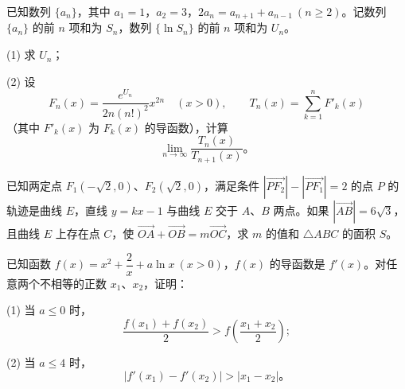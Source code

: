 \begin{question}
已知数列 $\{a_n\}$，其中 $a_1=1$，$a_2=3$，$2a_n=a_{n+1}+a_{n-1}\ (n\geqslant2)$。记数列 $\{a_n\}$ 的前 $n$ 项和为 $S_n$，数列 $\{\ln S_n\}$ 的前 $n$ 项和为 $U_n$。

(1) 求 $U_n$；

(2) 设
\nopagebreak[4]
\[
F_n(x)=\frac{e^{U_n}}{2n(n!)^2}x^{2n}\quad(x>0),\qquad
T_n(x)=\sum_{k=1}^{n}F'_k(x)
\]
（其中 $F'_k(x)$ 为 $F_k(x)$ 的导函数），计算
\nopagebreak[4]
\[
\lim_{n\to\infty}\frac{T_n(x)}{T_{n+1}(x)}\mbox{。}
\]

\end{question}
\begin{question}
已知两定点 $F_1(-\sqrt2,0)\text{、}F_2(\sqrt2,0)$，满足条件 $|\overrightarrow{PF_2}|-|\overrightarrow{PF_1}|=2$ 的点 $P$ 的轨迹是曲线 $E$，直线 $y=kx-1$ 与曲线 $E$ 交于 $A\text{、}B$ 两点。如果 $|\overrightarrow{AB}|=6\sqrt3$，且曲线 $E$ 上存在点 $C$，使 $\overrightarrow{OA}+\overrightarrow{OB}=m\overrightarrow{OC}$，求 $m$ 的值和 $\triangle ABC$ 的面积 $S$。

\end{question}
\begin{question}
已知函数 $f(x)=x^2+\dfrac2x+a\ln x\ (x>0)$，$f(x)$ 的导函数是 $f'(x)$。对任意两个不相等的正数 $x_1\text{、}x_2$，证明：

(1) 当 $a\leqslant0$ 时，
\nopagebreak[4]
\[
\frac{f(x_1)+f(x_2)}2>f\left(\frac{x_1+x_2}2\right);
\]

(2) 当 $a\leqslant4$ 时，
\nopagebreak[4]
\[
|f'(x_1)-f'(x_2)|>|x_1-x_2|\mbox{。}
\]

\end{question}